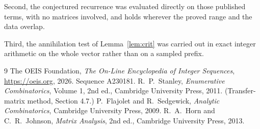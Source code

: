 \documentclass[11pt,a4paper]{article}
\theoremstyle{plain}
\theoremstyle{definition}
\begin{document}
Second, the conjectured recurrence was evaluated directly on those published terms, with no
matrices involved, and holds wherever the proved range and the data overlap.

Third, the annihilation test of Lemma~\ref{lem:crit} was carried out in exact integer
arithmetic on the whole vector rather than on a sampled prefix.

\begin{thebibliography}{9}
 The OEIS Foundation, \emph{The On-Line Encyclopedia of Integer
Sequences}, \url{https://oeis.org}, 2026. Sequence A230181.
 R.~P.~Stanley, \emph{Enumerative Combinatorics}, Volume 1, 2nd ed.,
Cambridge University Press, 2011. (Transfer-matrix method, Section 4.7.)
 P.~Flajolet and R.~Sedgewick, \emph{Analytic Combinatorics}, Cambridge
University Press, 2009.
 R.~A.~Horn and C.~R.~Johnson, \emph{Matrix Analysis}, 2nd ed., Cambridge
University Press, 2013.
\end{thebibliography}
\end{document}
